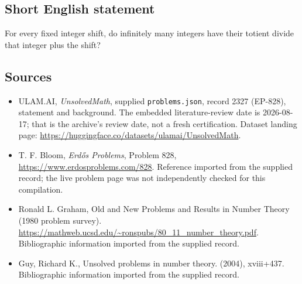 \documentclass[11pt,a4paper]{article}
\begin{document}
\subsection{Short English statement}

For every fixed integer shift, do infinitely many integers have their totient divide that integer plus the shift?

\subsection{Sources}

{\small

\begin{itemize}

\item[\hypertarget{source:2327:1}{S1}] ULAM.AI, \emph{UnsolvedMath}, supplied \texttt{problems.json}, record 2327 (EP-828), statement and background. The embedded literature-review date is 2026-08-17; that is the archive’s review date, not a fresh certification. Dataset landing page: \url{https://huggingface.co/datasets/ulamai/UnsolvedMath}.

\item[\hypertarget{source:2327:2}{S2}] T. F. Bloom, \emph{Erdős Problems}, Problem 828, \url{https://www.erdosproblems.com/828}. Reference imported from the supplied record; the live problem page was not independently checked for this compilation.

\item[\hypertarget{source:2327:3}{S3}] Ronald L. Graham, Old and New Problems and Results in Number Theory (1980 problem survey). \url{https://mathweb.ucsd.edu/~ronspubs/80_11_number_theory.pdf}. Bibliographic information imported from the supplied record.

\item[\hypertarget{source:2327:4}{S4}] Guy, Richard K., Unsolved problems in number theory. (2004), xviii+437. Bibliographic information imported from the supplied record.

\end{itemize}

}

\label{end:2327}
\end{document}
